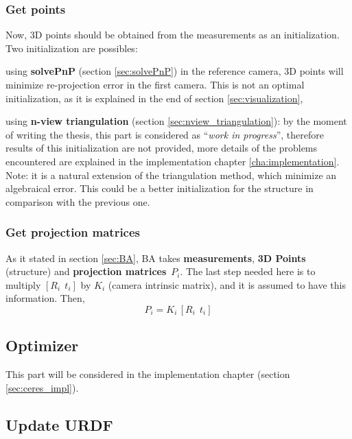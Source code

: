 \subsubsection*{Get points}

Now, 3D points should be obtained from the measurements as an initialization. Two initialization are possibles:
\begin{itemize*}
 \item using \textbf{solvePnP} (section \ref{sec:solvePnP}) in the reference camera, 3D points will minimize re-projection error in the first camera. This is not an optimal initialization, as it is explained in the end of section \ref{sec:visualization},

 \item using \textbf{n-view triangulation} (section \ref{sec:nview_triangulation}): by the moment of writing the thesis, this part is considered as ``\textit{work in progress}'', therefore results of this initialization are not provided, more details of the problems encountered are explained in the implementation chapter \ref{cha:implementation}. Note: it is a natural extension of the triangulation method, which minimize an algebraical error. This could be a better initialization for the structure in comparison with the previous one.
\end{itemize*}



\subsubsection*{Get projection matrices}

As it stated in section \ref{sec:BA}, BA takes \textbf{measurements}, \textbf{3D Points} (structure) and \textbf{projection matrices}~$P_i$. The last step needed here is to multiply $[R_i ~~ t_i]$ by $K_i$ (camera intrinsic matrix), and it is assumed to have this information. Then,
\[
 P_i = K_i \, [R_i ~~ t_i]
\]


\subsection{Optimizer}

This part will be considered in the implementation chapter (section \ref{sec:ceres_impl}).


\subsection{Update URDF}
\label{sec:update_urdf}


